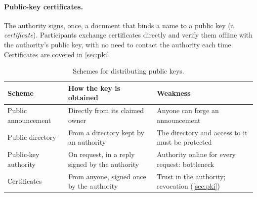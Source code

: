 \paragraph{Public-key certificates.} The authority signs, once, a document that binds a name to a public key (a \emph{certificate}). Participants exchange certificates directly and verify them offline with the authority's public key, with no need to contact the authority each time. Certificates are covered in \cref{sec:pki}.

\begin{table}[H]
\centering
\caption{Schemes for distributing public keys.}
\label{tab:pk-distribution}
\begin{tabularx}{\textwidth}{@{}l X X@{}}
\toprule
Scheme & How the key is obtained & Weakness \\
\midrule
Public announcement & Directly from its claimed owner & Anyone can forge an announcement \\
Public directory & From a directory kept by an authority & The directory and access to it must be protected \\
Public-key authority & On request, in a reply signed by the authority & Authority online for every request: bottleneck \\
Certificates & From anyone, signed once by the authority & Trust in the authority; revocation (\cref{sec:pki}) \\
\bottomrule
\end{tabularx}
\end{table}

